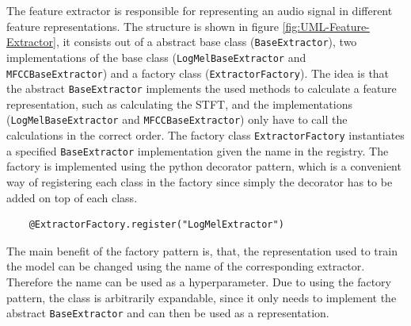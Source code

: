 \noindent
The feature extractor is responsible for representing an audio signal in different feature representations. The structure is shown in figure \ref{fig:UML-Feature-Extractor}, it consists out of a abstract base class (\texttt{BaseExtractor}), two implementations of the base class (\texttt{LogMelBaseExtractor} and \texttt{MFCCBaseExtractor}) and a factory class (\texttt{ExtractorFactory}). The idea is that the abstract \texttt{BaseExtractor} implements the used methods to calculate a feature representation, such as calculating the \gls{STFT}, and the implementations (\texttt{LogMelBaseExtractor} and \texttt{MFCCBaseExtractor}) only have to call the calculations in the correct order. The factory class \texttt{ExtractorFactory} instantiates a specified \texttt{BaseExtractor} implementation given the name in the registry. The factory is implemented using the python decorator pattern, which is a convenient way of registering each class in the factory since simply the decorator has to be added on top of each class.
\begin{verbatim}
    @ExtractorFactory.register("LogMelExtractor")
\end{verbatim}
The main benefit of the factory pattern is, that, the representation used to train the model can be changed using the name of the corresponding extractor. Therefore the name can be used as a hyperparameter. Due to using the factory pattern, the class is arbitrarily expandable, since it only needs to implement the abstract \texttt{BaseExtractor} and can then be used as a representation.

